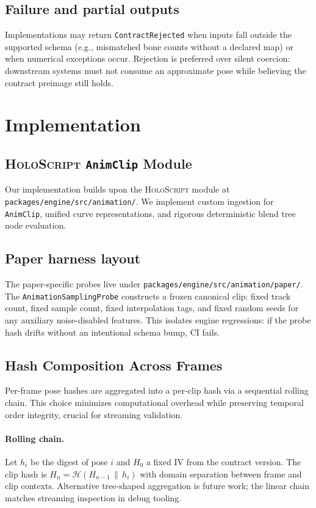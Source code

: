 \documentclass[sigconf,nonacm]{acmart}
\newcommand{\holoscript}{\textsc{HoloScript}}
\newcommand{\animclip}{\texttt{AnimClip}}
\newcommand{\hashfn}{\mathcal{H}}
\begin{document}
\subsection{Failure and partial outputs}
Implementations may return \texttt{ContractRejected} when inputs fall outside
the supported schema (e.g., mismatched bone counts without a declared map) or
when numerical exceptions occur. Rejection is preferred over silent coercion:
downstream systems must not consume an approximate pose while believing the
contract preimage still holds.

\section{Implementation}
\label{sec:impl}

\subsection{\holoscript{} \animclip{} Module}
Our implementation builds upon the \holoscript{} module at \texttt{packages/engine/src/animation/}. We implement custom ingestion for \animclip{}, unified curve representations, and rigorous deterministic blend tree node evaluation. %

\subsection{Paper harness layout}
The paper-specific probes live under
\texttt{packages/engine/src/animation/paper/}. The
\texttt{AnimationSamplingProbe} constructs a frozen canonical clip: fixed
track count, fixed sample count, fixed interpolation tags, and fixed random
seeds for any auxiliary noise-disabled features. This isolates engine
regressions: if the probe hash drifts without an intentional schema bump, CI
fails.

\subsection{Hash Composition Across Frames}
Per-frame pose hashes are aggregated into a per-clip hash via a sequential rolling chain. This choice minimizes computational overhead while preserving temporal order integrity, crucial for streaming validation. %

\paragraph{Rolling chain.}
Let $h_i$ be the digest of pose $i$ and $H_0$ a fixed IV from the contract
version. The clip hash is $H_n = \hashfn(H_{n-1} \,\|\, h_i)$ with domain
separation between frame and clip contexts. Alternative tree-shaped
aggregation is future work; the linear chain matches streaming inspection in
debug tooling.
\end{document}
